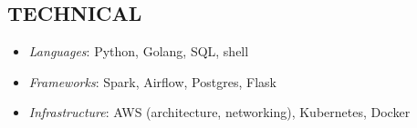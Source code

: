 \documentclass[geomargin]{res}
\begin{document}
\begin{resume}
%


\section{TECHNICAL}

\begin{itemize}
  \item \textit{Languages}: Python, Golang, SQL, shell
  \item \textit{Frameworks}: Spark, Airflow, Postgres, Flask
  \item \textit{Infrastructure}: AWS (architecture, networking), Kubernetes, Docker
\end{itemize}



\end{resume}
\end{document}

